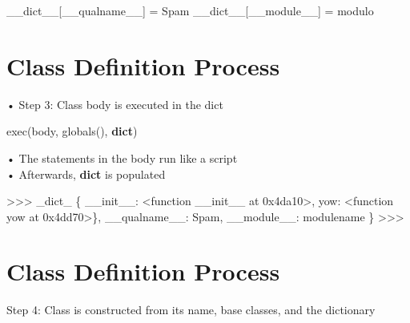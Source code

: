 \documentclass[
  letterpaper,
  DIV=11,
  numbers=noendperiod]{scrreprt}
\newenvironment{Shaded}{\begin{snugshade}}{\end{snugshade}}
\newcommand{\NormalTok}[1]{\textcolor[rgb]{0.00,0.23,0.31}{#1}}
\newcommand{\OperatorTok}[1]{\textcolor[rgb]{0.37,0.37,0.37}{#1}}
\newcommand{\StringTok}[1]{\textcolor[rgb]{0.13,0.47,0.30}{#1}}
\begin{document}
\begin{Shaded}
\begin{Highlighting}[]
\NormalTok{\_\_dict\_\_[}\StringTok{\textquotesingle{}\_\_qualname\_\_\textquotesingle{}}\NormalTok{] }\OperatorTok{=} \StringTok{\textquotesingle{}Spam\textquotesingle{}}  
\NormalTok{\_\_dict\_\_[}\StringTok{\textquotesingle{}\_\_module\_\_\textquotesingle{}}\NormalTok{] }\OperatorTok{=} \StringTok{\textquotesingle{}modulo\textquotesingle{}} 
\end{Highlighting}
\end{Shaded}


\chapter{Class Definition Process}\label{class-definition-process-2}

• Step 3: Class body is executed in the dict

exec(body, globals(), \textbf{dict})

• The statements in the body run like a script\\
• Afterwards, \textbf{dict} is populated

\begin{Shaded}
\begin{Highlighting}[]
\NormalTok{\textgreater{}\textgreater{}\textgreater{} \_dict\_  }
\NormalTok{\{  }
\NormalTok{    \textquotesingle{}\_\_init\_\_\textquotesingle{}: \textless{}function \_\_init\_\_ at 0x4da10\textgreater{},  }
\NormalTok{    \textquotesingle{}yow\textquotesingle{}: \textless{}function yow at 0x4dd70\textgreater{}\},  }
\NormalTok{    \textquotesingle{}\_\_qualname\_\_\textquotesingle{}: \textquotesingle{}Spam\textquotesingle{},  }
\NormalTok{    \textquotesingle{}\_\_module\_\_\textquotesingle{}: \textquotesingle{}modulename\textquotesingle{}  }
\NormalTok{\}  }
\NormalTok{\textgreater{}\textgreater{}\textgreater{} }
\end{Highlighting}
\end{Shaded}


\chapter{Class Definition Process}\label{class-definition-process-3}

Step 4: Class is constructed from its name, base classes, and the
dictionary
\end{document}
